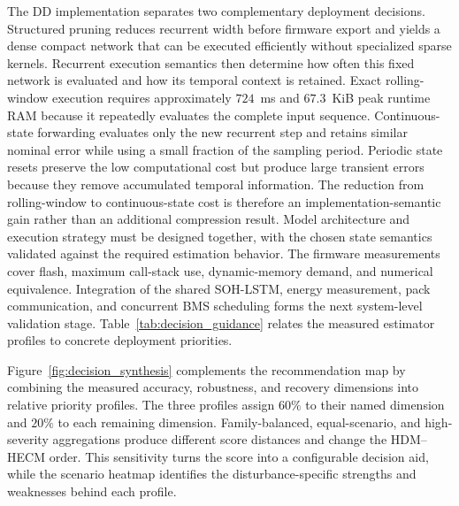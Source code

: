 \documentclass[review,nopreprintline]{elsarticle}
\begin{document}
The DD implementation separates two complementary deployment decisions. Structured pruning reduces recurrent width before firmware export and yields a dense compact network that can be executed efficiently without specialized sparse kernels. Recurrent execution semantics then determine how often this fixed network is evaluated and how its temporal context is retained. Exact rolling-window execution requires approximately $724$~ms and $67.3$~KiB peak runtime RAM because it repeatedly evaluates the complete input sequence. Continuous-state forwarding evaluates only the new recurrent step and retains similar nominal error while using a small fraction of the sampling period. Periodic state resets preserve the low computational cost but produce large transient errors because they remove accumulated temporal information. The reduction from rolling-window to continuous-state cost is therefore an implementation-semantic gain rather than an additional compression result. Model architecture and execution strategy must be designed together, with the chosen state semantics validated against the required estimation behavior. The firmware measurements cover flash, maximum call-stack use, dynamic-memory demand, and numerical equivalence. Integration of the shared SOH-LSTM, energy measurement, pack communication, and concurrent BMS scheduling forms the next system-level validation stage. Table~\ref{tab:decision_guidance} relates the measured estimator profiles to concrete deployment priorities.

Figure~\ref{fig:decision_synthesis} complements the recommendation map by combining the measured accuracy, robustness, and recovery dimensions into relative priority profiles. The three profiles assign $60\%$ to their named dimension and $20\%$ to each remaining dimension. Family-balanced, equal-scenario, and high-severity aggregations produce different score distances and change the HDM--HECM order. This sensitivity turns the score into a configurable decision aid, while the scenario heatmap identifies the disturbance-specific strengths and weaknesses behind each profile.
\end{document}
